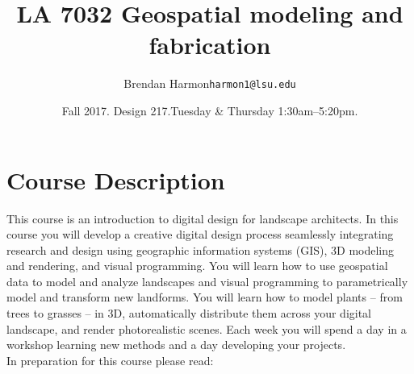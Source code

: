 \documentclass[11pt,article,oneside]{memoir}
\makeatletter
\def\myauthor{Author}
\def\mytitle{Title}
\def\myemail{harmon1@lsu.edu}
\def\myauthor{Brendan Harmon}
\def\mytitle{{\normalsize \textsc{LA} 7032\newline} \huge \bfseries Geospatial modeling and fabrication}
\makeatother
\begin{document}
\setlength\bibitemsep{0.75em}

\setmainfont[Scale=1, Path = fonts/lato/,BoldItalicFont=Lato-RegIta,BoldFont=Lato-Reg,ItalicFont=Lato-LigIta]{Lato-Lig}
\setsansfont[Scale=1, Path = fonts/lato/,BoldItalicFont=Lato-RegIta,BoldFont=Lato-Reg,ItalicFont=Lato-LigIta]{Lato-Lig}
\setmonofont[Mapping=tex-text,Scale=0.8,Path = fonts/inconsolata/]{i}

\def\ind{\hangindent=1 true cm\hangafter=1 \noindent}
\def\labelitemi{$\cdot$}
\title{\LARGE \mytitle}     
\author{\Large\myauthor \newline \footnotesize\texttt{\noindent\myemail}}
\date{Fall 2017. Design 217.\newline Tuesday \& Thursday 1:30am--5:20pm.}
\published{\,}

\maketitle


\section{Course Description}

This course is an introduction to digital design for landscape architects. 
%
In this course you will develop a creative digital design process 
seamlessly integrating research and design
using geographic information systems (GIS),
3D modeling and rendering, and
visual programming. 
%
You will learn how to use geospatial data 
to model and analyze landscapes
and visual programming to 
parametrically model and transform new landforms. 
%
You will learn how to model plants -- from trees to grasses -- in 3D, 
automatically distribute them across your digital landscape,
and render photorealistic scenes. 
%
Each week you will spend a day in a workshop
learning new methods
and a day developing your projects.\\

\noindent In preparation for this course please read:
%
\nocite{*} \printbibliography[keyword=intro, heading=none]

\end{document}
